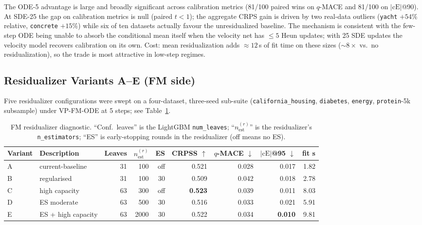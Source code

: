 \documentclass{article}
\begin{document}
The ODE-5 advantage is large and broadly significant across calibration metrics (81/100 paired wins on $q$-MACE and 81/100 on $|\text{cE}|$@90). At SDE-25 the gap on calibration metrics is null (paired $t<1$); the aggregate CRPS gain is driven by two real-data outliers (\texttt{yacht} $+54\%$ relative, \texttt{concrete} $+15\%$) while six of ten datasets actually favour the unresidualized baseline. The mechanism is consistent with the few-step ODE being unable to absorb the conditional mean itself when the velocity net has $\leq 5$ Heun updates; with 25 SDE updates the velocity model recovers calibration on its own. Cost: mean residualization adds $\approx 12$\,s of fit time on these sizes ($\sim 8\times$ vs.\ no residualization), so the trade is most attractive in low-step regimes.

\subsection{Residualizer Variants A--E (FM side)}\label{app:resid-AE}

Five residualizer configurations were swept on a four-dataset, three-seed sub-suite (\texttt{california\_housing}, \texttt{diabetes}, \texttt{energy}, \texttt{protein}-5k subsample) under VP-FM-ODE at 5 steps; see Table~\ref{tab:resid-AE}.

\begin{table}[!h]
  \centering
  \caption{FM residualizer diagnostic. ``Conf.\ leaves'' is the LightGBM \texttt{num\_leaves}; ``$n_{\text{est}}^{(r)}$'' is the residualizer's \texttt{n\_estimators}; ``ES'' is early-stopping rounds in the residualizer (off means no ES).}\label{tab:resid-AE}
  \footnotesize
  \begin{tabular}{llrrrrrrr}
    \toprule
    Variant & Description & Leaves & $n_{\text{est}}^{(r)}$ & ES & CRPSS $\uparrow$ & $q$-MACE $\downarrow$ & $|\text{cE}|$@95 $\downarrow$ & fit s \\
    \midrule
    A & current-baseline   & 31 & 100 & off & 0.521 & 0.028 & 0.017 & 1.82 \\
    B & regularised        & 31 & 100 & 30  & 0.509 & 0.042 & 0.018 & 2.78 \\
    C & high capacity      & 63 & 300 & off & \textbf{0.523} & 0.039 & 0.011 & 8.03 \\
    D & ES moderate        & 63 & 500 & 30  & 0.516 & 0.033 & 0.021 & 5.91 \\
    E & ES + high capacity & 63 & 2000& 30  & 0.522 & 0.034 & \textbf{0.010} & 9.81 \\
    \bottomrule
  \end{tabular}
\end{table}
\end{document}
